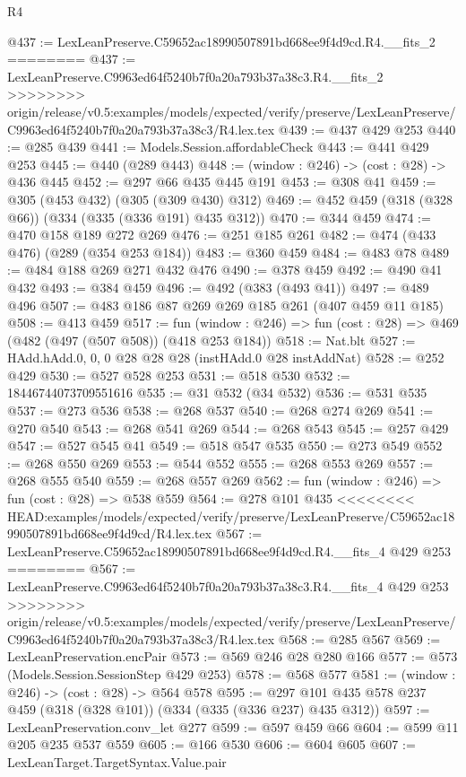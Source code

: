 \begin{lexlean}{R4}
\begin{coremodule}
{{{{{{{{{{{{{{@437 := LexLeanPreserve.C59652ac18990507891bd668ee9f4d9cd.R4.__fits_2
========
@437 := LexLeanPreserve.C9963ed64f5240b7f0a20a793b37a38c3.R4.__fits_2
>>>>>>>> origin/release/v0.5:examples/models/expected/verify/preserve/LexLeanPreserve/C9963ed64f5240b7f0a20a793b37a38c3/R4.lex.tex
@439 := @437 @429 @253
@440 := @285 @439
@441 := Models.Session.affordableCheck
@443 := @441 @429 @253
@445 := @440 (@289 @443)
@448 := (window : @246) -> (cost : @28) -> @436 @445
@452 := @297 @66 @435 @445 @191
@453 := @308 @41
@459 := @305 (@453 @432) (@305 (@309 @430) @312)
@469 := @452 @459 (@318 (@328 @66)) (@334 (@335 (@336 @191) @435 @312))
@470 := @344 @459
@474 := @470 @158 @189 @272 @269
@476 := @251 @185 @261
@482 := @474 (@433 @476) (@289 (@354 @253 @184))
@483 := @360 @459
@484 := @483 @78
@489 := @484 @188 @269 @271 @432 @476
@490 := @378 @459
@492 := @490 @41 @432
@493 := @384 @459
@496 := @492 (@383 (@493 @41))
@497 := @489 @496
@507 := @483 @186 @87 @269 @269 @185 @261 (@407 @459 @11 @185)
@508 := @413 @459
@517 := fun (window : @246) => fun (cost : @28) => @469 (@482 (@497 (@507 @508)) (@418 @253 @184))
@518 := Nat.blt
@527 := HAdd.hAdd.{0, 0, 0} @28 @28 @28 (instHAdd.{0} @28 instAddNat)
@528 := @252 @429
@530 := @527 @528 @253
@531 := @518 @530
@532 := 18446744073709551616
@535 := @31 @532 (@34 @532)
@536 := @531 @535
@537 := @273 @536
@538 := @268 @537
@540 := @268 @274 @269
@541 := @270 @540
@543 := @268 @541 @269
@544 := @268 @543
@545 := @257 @429
@547 := @527 @545 @41
@549 := @518 @547 @535
@550 := @273 @549
@552 := @268 @550 @269
@553 := @544 @552
@555 := @268 @553 @269
@557 := @268 @555 @540
@559 := @268 @557 @269
@562 := fun (window : @246) => fun (cost : @28) => @538 @559
@564 := @278 @101 @435
<<<<<<<< HEAD:examples/models/expected/verify/preserve/LexLeanPreserve/C59652ac18990507891bd668ee9f4d9cd/R4.lex.tex
@567 := LexLeanPreserve.C59652ac18990507891bd668ee9f4d9cd.R4.__fits_4 @429 @253
========
@567 := LexLeanPreserve.C9963ed64f5240b7f0a20a793b37a38c3.R4.__fits_4 @429 @253
>>>>>>>> origin/release/v0.5:examples/models/expected/verify/preserve/LexLeanPreserve/C9963ed64f5240b7f0a20a793b37a38c3/R4.lex.tex
@568 := @285 @567
@569 := LexLeanPreservation.encPair
@573 := @569 @246 @28 @280 @166
@577 := @573 (Models.Session.SessionStep @429 @253)
@578 := @568 @577
@581 := (window : @246) -> (cost : @28) -> @564 @578
@595 := @297 @101 @435 @578 @237 @459 (@318 (@328 @101)) (@334 (@335 (@336 @237) @435 @312))
@597 := LexLeanPreservation.conv_let @277
@599 := @597 @459 @66
@604 := @599 @11 @205 @235 @537 @559
@605 := @166 @530
@606 := @604 @605
@607 := LexLeanTarget.TargetSyntax.Value.pair
}}}}}}}}}}}}}}
\end{coremodule}
\end{lexlean}

